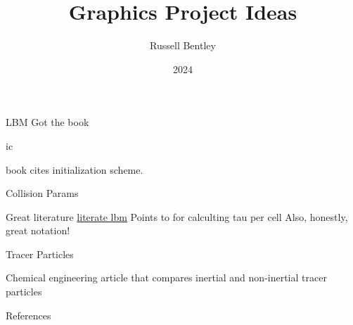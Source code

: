 \documentclass{beamer}
\title{Graphics Project Ideas}
\author{Russell Bentley}
\institute{Stony Brook}
\date{2024}
\begin{document}
\frame{\titlepage}





\begin{frame}{LBM}
Got the book \cite{Kruger2018}

\end{frame}

\begin{frame}{ic}
\begin{outline}
  \1 \cite{Mei2006} book cites initialization scheme.
\end{outline}
\end{frame}

\begin{frame}{Collision Params}
\begin{outline}
  \1 Great literature \href{http://literatelb.org}{literate lbm}
  \1 Points to \cite{Yu2005} for calculting tau per cell
    \2 Also, honestly, great notation!
\end{outline}
\end{frame}

\begin{frame}{Tracer Particles}
  \begin{outline}
    \1 Chemical engineering article that compares inertial and non-inertial tracer particles \cite{Hofmann2022}
  \end{outline}
\end{frame}

\begin{frame}[allowframebreaks]{References}
    \tiny
    \printbibliography
\end{frame}
\end{document}
